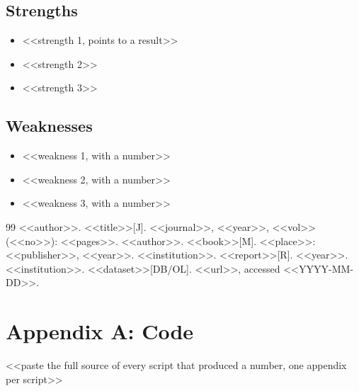 \documentclass[<<options>>]{apmcmthesis}
\begin{document}
\subsection{Strengths}
\begin{itemize}
  \item <<strength 1, points to a result>>
  \item <<strength 2>>
  \item <<strength 3>>
\end{itemize}
\subsection{Weaknesses}
\begin{itemize}
  \item <<weakness 1, with a number>>
  \item <<weakness 2, with a number>>
  \item <<weakness 3, with a number>>
\end{itemize}

\begin{thebibliography}{99}
 <<author>>. <<title>>[J]. <<journal>>, <<year>>, <<vol>>(<<no>>): <<pages>>.
 <<author>>. <<book>>[M]. <<place>>: <<publisher>>, <<year>>.
 <<institution>>. <<report>>[R]. <<year>>.
 <<institution>>. <<dataset>>[DB/OL]. <<url>>, accessed <<YYYY-MM-DD>>.
\end{thebibliography}

\appendix
\section{Appendix A: Code}
%
<<paste the full source of every script that produced a number, one appendix per script>>
\end{document}
